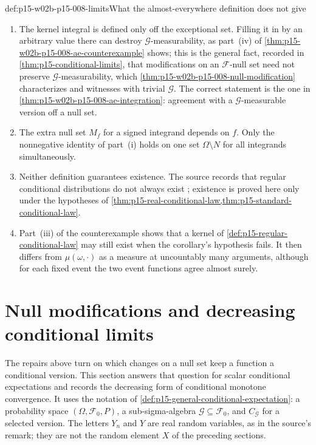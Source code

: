 \begin{hbwarning}{def:p15-w02b-p15-008-limits}{What the almost-everywhere definition does not give}
\begin{enumerate}
\item The kernel integral is defined only off the exceptional set. Filling
      it in by an arbitrary value there can destroy
      \(\mathcal G\)-measurability, as part~(iv) of
      \cref{thm:p15-w02b-p15-008-ae-counterexample} shows; this is the
      general fact, recorded in \cref{thm:p15-conditional-limits}, that
      modifications on an \(\mathcal F\)-null set need not preserve
      \(\mathcal G\)-measurability, which
      \cref{thm:p15-w02b-p15-008-null-modification} characterizes and
      witnesses with trivial \(\mathcal G\). The correct statement is the one in
      \cref{thm:p15-w02b-p15-008-ae-integration}: agreement with a
      \(\mathcal G\)-measurable version off a null set.
\item The extra null set \(M_f\) for a signed integrand depends on \(f\).
      Only the nonnegative identity of part~(i) holds on one set
      \(\Omega\setminus N\) for all integrands simultaneously.
\item Neither definition guarantees existence. The source records that
      regular conditional distributions do not always exist
      \cite[p.~214]{DurrettPTEAuthor2019}; existence is proved here only
      under the hypotheses of
      \cref{thm:p15-real-conditional-law,thm:p15-standard-conditional-law}.
\item Part~(iii) of the counterexample shows that a kernel of
      \cref{def:p15-regular-conditional-law} may still exist when the
      corollary's hypothesis fails. It then differs from \(\mu(\omega,\cdot)\)
      as a measure at uncountably many arguments, although for each fixed
      event the two event functions agree almost surely.
\end{enumerate}
\end{hbwarning}

\section{Null modifications and decreasing conditional limits}
\label{sec:p15-w02b-p15-008-version-limits}

The repairs above turn on which changes on a null set keep a function a
conditional version. This section answers that question for scalar
conditional expectations and records the decreasing form of conditional
monotone convergence. It uses the notation of
\cref{def:p15-general-conditional-expectation}: a probability space
\((\Omega,\mathcal F_0,P)\), a sub-sigma-algebra
\(\mathcal G\subseteq\mathcal F_0\), and \(C_{\mathcal G}\) for a selected
version. The letters \(Y_n\) and \(Y\) are real random variables, as in
the source's remark; they are not the random element \(X\) of the
preceding sections.

